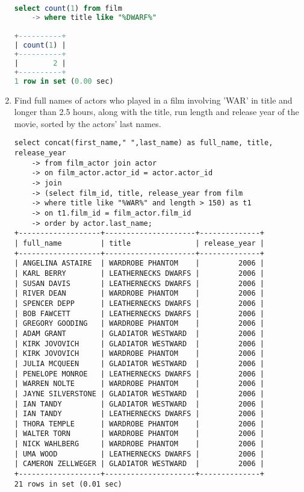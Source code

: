 \documentclass[12pt]{article}
\begin{document}
\begin{enumerate}
\begin{lstlisting}[language=SQL]
select count(1) from film
    -> where title like "%DWARF%"

+----------+
| count(1) |
+----------+
|        2 |
+----------+
1 row in set (0.00 sec)

\end{lstlisting}


\item Find full names of actors who played in a film involving ’WAR’ in title and longer than 2.5 hours, along with the title, run length and release year of the movie, sorted by the actors’ last names.

\begin{lstlisting}
select concat(first_name," ",last_name) as full_name, title, release_year 
    -> from film_actor join actor
    -> on film_actor.actor_id = actor.actor_id
    -> join
    -> (select film_id, title, release_year from film
    -> where title like "%WAR%" and length > 150) as t1
    -> on t1.film_id = film_actor.film_id
    -> order by actor.last_name;
+-------------------+---------------------+--------------+
| full_name         | title               | release_year |
+-------------------+---------------------+--------------+
| ANGELINA ASTAIRE  | WARDROBE PHANTOM    |         2006 |
| KARL BERRY        | LEATHERNECKS DWARFS |         2006 |
| SUSAN DAVIS       | LEATHERNECKS DWARFS |         2006 |
| RIVER DEAN        | WARDROBE PHANTOM    |         2006 |
| SPENCER DEPP      | LEATHERNECKS DWARFS |         2006 |
| BOB FAWCETT       | LEATHERNECKS DWARFS |         2006 |
| GREGORY GOODING   | WARDROBE PHANTOM    |         2006 |
| ADAM GRANT        | GLADIATOR WESTWARD  |         2006 |
| KIRK JOVOVICH     | GLADIATOR WESTWARD  |         2006 |
| KIRK JOVOVICH     | WARDROBE PHANTOM    |         2006 |
| JULIA MCQUEEN     | GLADIATOR WESTWARD  |         2006 |
| PENELOPE MONROE   | LEATHERNECKS DWARFS |         2006 |
| WARREN NOLTE      | WARDROBE PHANTOM    |         2006 |
| JAYNE SILVERSTONE | GLADIATOR WESTWARD  |         2006 |
| IAN TANDY         | GLADIATOR WESTWARD  |         2006 |
| IAN TANDY         | LEATHERNECKS DWARFS |         2006 |
| THORA TEMPLE      | WARDROBE PHANTOM    |         2006 |
| WALTER TORN       | WARDROBE PHANTOM    |         2006 |
| NICK WAHLBERG     | WARDROBE PHANTOM    |         2006 |
| UMA WOOD          | LEATHERNECKS DWARFS |         2006 |
| CAMERON ZELLWEGER | GLADIATOR WESTWARD  |         2006 |
+-------------------+---------------------+--------------+
21 rows in set (0.01 sec)



\end{lstlisting}
\end{enumerate}
\end{document}
